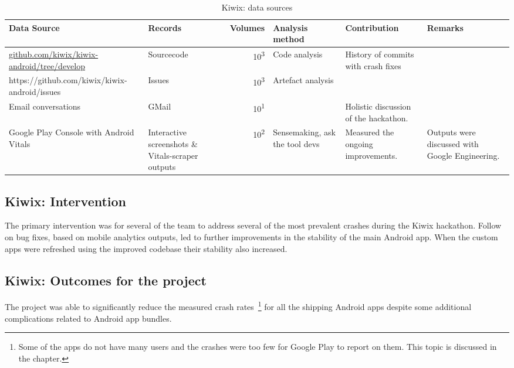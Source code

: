 \begin{table}
    \centering
    \footnotesize
    \tabcolsep=0.12cm
    \begin{tabular}{p{4cm}p{2.4cm}rp{2.1cm}p{2.2cm}p{2.5cm}}
        Data Source & Records & Volumes & Analysis method & Contribution & Remarks \\
        \toprule
         {\tiny \href{https://github.com/kiwix/kiwix-android/tree/develop}{github.com/kiwix/kiwix-android/tree/develop}} & Sourcecode & 10\textsuperscript{3} & Code analysis & History of commits with crash fixes &  \\
         {\tiny https://github.com/kiwix/kiwix-android/issues} & Issues & 10\textsuperscript{3} & Artefact analysis & \\
         Email conversations & GMail & 10\textsuperscript{1} & & Holistic discussion of the hackathon. &  \\
         Google Play Console with Android Vitals &Interactive screenshots \& Vitals-scraper outputs &10\textsuperscript{2} & Sensemaking, ask the tool devs & Measured the ongoing improvements. & Outputs were discussed with Google Engineering. \\
         \bottomrule
    \end{tabular}
    \caption{Kiwix: data sources}
    \label{tab:kiwix-data-sources}
\end{table}


\subsection{Kiwix: Intervention}
The primary intervention was for several of the team to address several of the most prevalent crashes during the Kiwix hackathon. Follow on bug fixes, based on mobile analytics outputs, led to further improvements in the stability of the main Android app. When the custom apps were refreshed using the improved codebase their stability also increased.

\subsection{Kiwix: Outcomes for the project}
The project was able to significantly reduce the measured crash rates~\footnote{Some of the apps do not have many users and the crashes were too few for Google Play to report on them. This topic is discussed in the  chapter.} for all the shipping Android apps despite some additional complications related to Android app bundles. 

